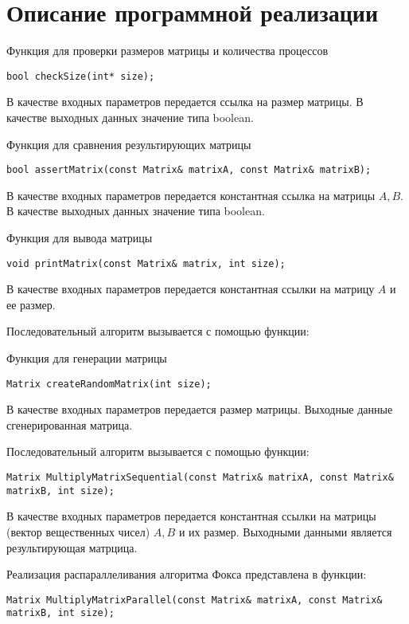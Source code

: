 \documentclass{report}
\begin{document}
\section*{Описание программной реализации}
Функция для проверки размеров матрицы и количества процессов
\begin{lstlisting}
bool checkSize(int* size);
\end{lstlisting}
\par В качестве входных параметров передается ссылка на размер матрицы. В качестве выходных данных значение типа boolean.
\par Функция для сравнения результирующих матрицы
\begin{lstlisting}
bool assertMatrix(const Matrix& matrixA, const Matrix& matrixB);
\end{lstlisting}
\par В качестве входных параметров передается константная ссылка на матрицы {\itshape $A, B$}. В качестве выходных данных значение типа boolean.
\par Функция для вывода матрицы
\begin{lstlisting}
void printMatrix(const Matrix& matrix, int size);
\end{lstlisting}
\par В качестве входных параметров передается константная ссылки на матрицу {\itshape $A$} и ее размер.
\par Последовательный алгоритм вызывается с помощью функции:
\par Функция для генерации матрицы
\begin{lstlisting}
Matrix createRandomMatrix(int size);
\end{lstlisting}
\par В качестве входных параметров передается размер матрицы. Выходные данные сгенерированная матрица.
\par Последовательный алгоритм вызывается с помощью функции:
\begin{lstlisting}
Matrix MultiplyMatrixSequential(const Matrix& matrixA, const Matrix& matrixB, int size);
\end{lstlisting}
\par В качестве входных параметров передается константная ссылки на матрицы (вектор вещественных чисел) {\itshape $A, B$} и их размер. Выходными данными является результирующая матрцица.
\par Реализация распараллеливания алгоритма Фокса представлена в функции:
\begin{lstlisting}
Matrix MultiplyMatrixParallel(const Matrix& matrixA, const Matrix& matrixB, int size);
\end{lstlisting}
\end{document}
